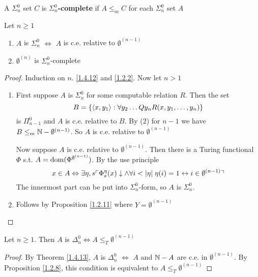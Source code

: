 \documentclass[11pt]{article}
\begin{document}
A \(\Sigma_n^0\) set \(C\) is \textbf{\(\Sigma_n^0\)-complete} if \(A\le_mC\) for each \(\Sigma_n^0\) set \(A\)

\begin{theorem}[]
\label{1.4.13}
Let \(n\ge 1\)
\begin{enumerate}
\item \(A\) is \(\Sigma_n^0\) \(\Leftrightarrow\) \(A\) is c.e. relative to \(\emptyset^{(n-1)}\)
\item \(\emptyset^{(n)}\) is \(\Sigma_n^0\)-complete
\end{enumerate}
\end{theorem}

\begin{proof}
Induction on \(n\).  \ref{1.4.12} and \ref{1.2.2}. Now let \(n>1\)
\begin{enumerate}
\item First suppose \(A\) is \(\Sigma_n^0\) for some computable relation \(R\). Then the set
\begin{equation*}
B=\{\langle x,y_1\rangle:\forall y_2\dots Qy_nR(x,y_1,\dots,y_n)\}
\end{equation*}
is \(\Pi_{n-1}^0\) and \(A\) is c.e. relative to \(B\). By (2) for \(n-1\) we
have \(B\le_m\mathbb{N}-\emptyset^{(n-1)}\). So \(A\) is c.e. relative to \(\emptyset^{(n-1)}\)

Now suppose \(A\) is c.e. relative to \(\emptyset^{(n-1)}\). Then there is a Turing functional \(\Phi\)
s.t. \(A=\operatorname{dom}(\Phi^{\emptyset^{(n-1)}})\). By the use principle
\begin{equation*}
x\in A\Leftrightarrow\exists\eta,s\ucorner{\Phi_s^\eta(x)\downarrow\wedge\forall i<\abs{\eta}\;\eta(i)=1\leftrightarrow i\in\emptyset^{(n-1)}}
\end{equation*}
The innermost part can be put into \(\Sigma_n^0\)-form, so \(A\) is \(\Sigma_n^0\).
\item Follows by Proposition \ref{1.2.11} where \(Y=\emptyset^{(n-1)}\)
\end{enumerate}
\end{proof}

\begin{proposition}[]
Let \(n\ge 1\). Then \(A\) is \(\Delta_n^0\Leftrightarrow A\le_T\emptyset^{(n-1)}\)
\end{proposition}

\begin{proof}
By Theorem \ref{1.4.13}, \(A\) is \(\Delta_n^0\) \(\Leftrightarrow\) \(A\) and \(\mathbb{N}-A\) are c.e. in \(\emptyset^{(n-1)}\). By
Proposition \ref{1.2.8}, this condition is equivalent to \(A\le_T\emptyset^{(n-1)}\)
\end{proof}
\end{document}
